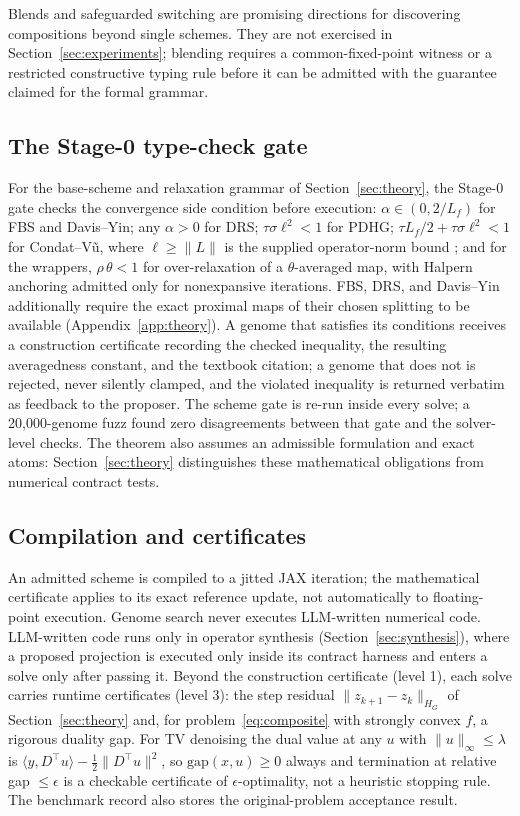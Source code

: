 Blends and safeguarded switching are promising directions for discovering
compositions beyond single schemes. They are not exercised in
Section~\ref{sec:experiments}; blending requires a common-fixed-point
witness or a restricted constructive typing rule before it can be admitted
with the guarantee claimed for the formal grammar.


\subsection{The Stage-0 type-check gate}

For the base-scheme and relaxation grammar of Section~\ref{sec:theory},
the Stage-0 gate checks the convergence side condition before execution:
$\alpha \in (0, 2/L_f)$ for FBS and Davis--Yin; any $\alpha > 0$
for DRS;
$\tau\sigma\ell^2 < 1$ for PDHG;
$\tau L_f/2 + \tau\sigma\ell^2 < 1$ for Condat--V\~u, where
$\ell \geq \|L\|$ is the supplied operator-norm bound
\citep[\S2.7 and \S3.3]{RyuYin2022LargeScale}; and for the wrappers,
$\rho\,\theta < 1$ for over-relaxation of a
$\theta$-averaged map, with Halpern anchoring admitted only
for nonexpansive iterations. FBS, DRS, and Davis--Yin additionally require
the exact proximal maps of their chosen splitting to be available
(Appendix~\ref{app:theory}). A genome that satisfies its conditions receives
a construction certificate recording the checked inequality, the
resulting averagedness constant, and the textbook citation; a genome that
does not is rejected, never silently clamped, and the violated
inequality is returned verbatim as feedback to the proposer. The scheme gate
is re-run inside every solve; a 20{,}000-genome fuzz found zero disagreements
between that gate and the solver-level checks. The theorem also assumes an
admissible formulation and exact atoms: Section~\ref{sec:theory}
distinguishes these mathematical obligations from numerical contract tests.


\subsection{Compilation and certificates}

An admitted scheme is compiled to a jitted JAX iteration; the mathematical
certificate applies to its exact reference update, not automatically to
floating-point execution. Genome search never executes LLM-written numerical
code. LLM-written code runs only in operator synthesis
(Section~\ref{sec:synthesis}), where a proposed projection is executed only
inside its contract harness and enters a solve only after passing it. Beyond the construction certificate
(level 1), each solve carries runtime certificates (level 3): the step residual
$\|z_{k+1}-z_k\|_{H_G}$ of Section~\ref{sec:theory} and, for
problem~\eqref{eq:composite} with strongly convex $f$, a rigorous duality
gap. For TV denoising the dual value at any
$u$ with $\|u\|_\infty \le \lambda$ is
$\langle y, D^{\!\top}u\rangle - \tfrac12\|D^{\!\top}u\|^2$, so
$\mathrm{gap}(x, u) \ge 0$ always and termination at relative gap
$\le \epsilon$ is a checkable certificate of $\epsilon$-optimality, not a
heuristic stopping rule. The benchmark record also stores the original-problem acceptance result.


